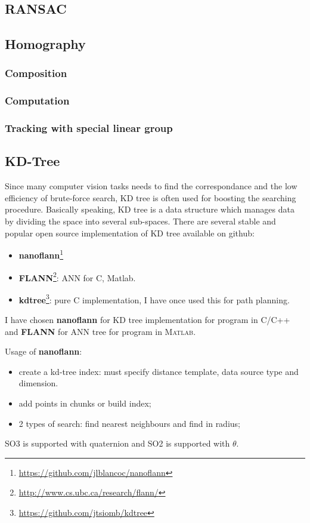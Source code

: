 \documentclass[a4paper]{report}
\begin{document}
\subsection{RANSAC}

\subsection{Homography}
\subsubsection{Composition}
\subsubsection{Computation}
\subsubsection{Tracking with special linear group}

\subsection{KD-Tree}
Since many computer vision tasks needs to find the correspondance and the low efficiency of brute-force search, KD tree is often used for boosting the searching procedure. Basically speaking, KD tree is a data structure which manages data by dividing the space into several sub-spaces. There are several stable and popular open source implementation of KD tree available on github:
\begin{itemize}
\item \textbf{nanoflann}\footnote{\url{https://github.com/jlblancoc/nanoflann}}
\item \textbf{FLANN}\footnote{\url{http://www.cs.ubc.ca/research/flann/}}: ANN for C, Matlab.
\item \textbf{kdtree}\footnote{\url{https://github.com/jtsiomb/kdtree}}: pure C implementation, I have once used this for path planning.
\end{itemize}
I have chosen \textbf{nanoflann} for KD tree implementation for program in \textsc{C/C++} and \textbf{FLANN} for ANN tree for program in \textsc{Matlab}.

Usage of \textbf{nanoflann}:
\begin{itemize}
\item create a kd-tree index: must specify distance template, data source type and dimension.
\item add points in chunks or build index;
\item 2 types of search: find nearest neighbours and find in radius;
\end{itemize}
SO3 is supported with quaternion and SO2 is supported with $\theta$.
\end{document}
